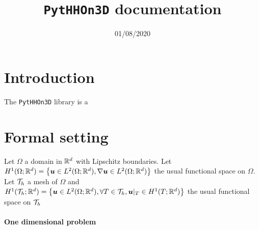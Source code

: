 \documentclass[fleqn]{article}
\title{\texttt{PytHHOn3D} documentation}
\date{01/08/2020}
\begin{document}
  \maketitle
  
  \section{Introduction}
      The \texttt{PytHHOn3D} library is a 

  \section{Formal setting}

      Let $\Omega$ a domain in $\Rd$ with Lipschitz boundaries.
      Let $\HConformal$ the usual functional space on $\Omega$.
      Let $\Mesh$ a mesh of $\Omega$ and $\HMesh$ the usual functional space on $\Mesh$

    \paragraph{One dimensional problem}

    

  
  
\end{document}
